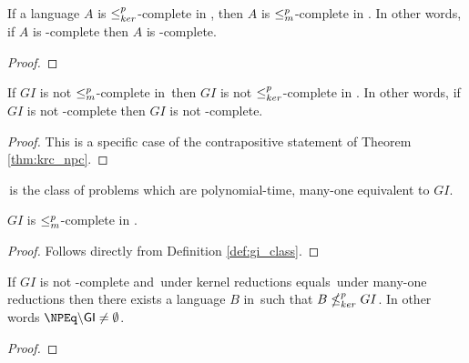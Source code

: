 \begin{theorem}\label{thm:krc_npc}If a language $A$ is $\leq^{p}_{ker}$-complete in \NPEq,
  then $A$ is $\leq^{p}_{m}$-complete in \NP. In other words, if $A$ is \NPEq-complete
  then $A$ is \NP-complete.\end{theorem}
\begin{proof}
\end{proof}

\begin{corollary}If $GI$ is not $\leq^{p}_{m}$-complete in \NP\,then $GI$ is not
  $\leq^{p}_{ker}$-complete in \NPEq. In other words, if $GI$ is not \NP-complete then
  $GI$ is not \NPEq-complete.\end{corollary}
\begin{proof}
  This is a specific case of the contrapositive statement of Theorem
  \ref{thm:krc_npc}.
\end{proof}

\begin{definition}\label{def:gi_class}\GI\,is the class of problems which are
  polynomial-time, many-one equivalent to $GI$.\end{definition}

\begin{lemma}$GI$ is $\leq^{p}_{m}$-complete in \GI.\end{lemma}
\begin{proof}Follows directly from Definition \ref{def:gi_class}.\end{proof}

\begin{theorem}If $GI$ is not \NP-complete and \NPEq\,under kernel reductions
  equals \GI\,under many-one reductions then there exists a language $B$ in
  \NPEq\,such that $B\nleq^{p}_{ker} GI$. In other words $\NPEq\backslash\GI\neq\emptyset$.\end{theorem}
\begin{proof}
\end{proof}
